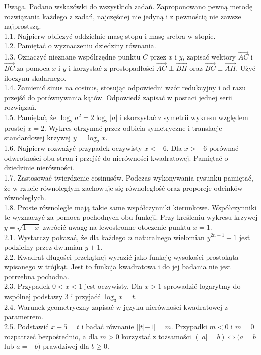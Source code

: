 \documentclass[10pt]{article}
\begin{document}
Uwaga. Podano wskazówki do wszystkich zadań. Zaproponowano pewną metodę rozwiązania każdego z zadań, najczęściej nie jedyną i z pewnością nie zawsze najprostszą.\\
1.1. Najpierw obliczyć oddzielnie masę stopu i masę srebra w stopie.\\
1.2. Pamiętać o wyznaczeniu dziedziny równania.\\
1.3. Oznaczyć nieznane współrzędne punktu $C$ przez $x$ i $y$, zapisać wektory $\overrightarrow{A C}$ i $\overrightarrow{B C}$ za pomoca $x$ i $y$ i korzystać z prostopadłości $\overrightarrow{A C} \perp \overrightarrow{B H}$ oraz $\overrightarrow{B C} \perp \overrightarrow{A H}$. Użyć iloczynu skalarnego.\\
1.4. Zamienić sinus na cosinus, stosując odpowiedni wzór redukcyjny i od razu przejść do porównywania kątów. Odpowiedź zapisać w postaci jednej serii rozwiązań.\\
1.5. Pamiętać, że $\log _{2} a^{2}=2 \log _{2}|a|$ i skorzystać z symetrii wykresu względem prostej $x=2$. Wykres otrzymać przez odbicia symetryczne i translacje standardowej krzywej $y=\log _{2} x$.\\
1.6. Najpierw rozważyć przypadek oczywisty $x<-6$. Dla $x>-6$ porównać odwrotności obu stron i przejść do nierówności kwadratowej. Pamiętać o dziedzinie nierówności.\\
1.7. Zastosować twierdzenie cosinusów. Podczas wykonywania rysunku pamiętać, że w rzucie równoległym zachowuje się równoległość oraz proporcje odcinków równoległych.\\
1.8. Proste równoległe mają takie same współczynniki kierunkowe. Współczynniki te wyznaczyć za pomoca pochodnych obu funkcji. Przy kreśleniu wykresu krzywej $y=\sqrt{1-x}$ zwrócić uwagę na lewostronne otoczenie punktu $x=1$.\\
2.1. Wystarczy pokazać, że dla każdego $n$ naturalnego wielomian $y^{2 n-1}+1$ jest podzielny przez dwumian $y+1$.\\
2.2. Kwadrat długości przekątnej wyrazić jako funkcję wysokości prostokąta wpisanego w trójkąt. Jest to funkcja kwadratowa i do jej badania nie jest potrzebna pochodna.\\
2.3. Przypadek $0<x<1$ jest oczywisty. Dla $x>1$ sprowadzić logarytmy do wspólnej podstawy 3 i przyjaćć $\log _{3} x=t$.\\
2.4. Warunek geometryczny zapisać w języku nierówności kwadratowej z parametrem.\\
2.5. Podstawić $x+5=t$ i badać równanie $||t|-1|=m$. Przypadki $m<0$ i $m=0$ rozpatrzeć bezpośrednio, a dla $m>0$ korzystać z tożsamości $(|a|=b) \Leftrightarrow(a=b$ lub $a=-b)$ prawdziwej dla $b \geq 0$.\\
\end{document}
